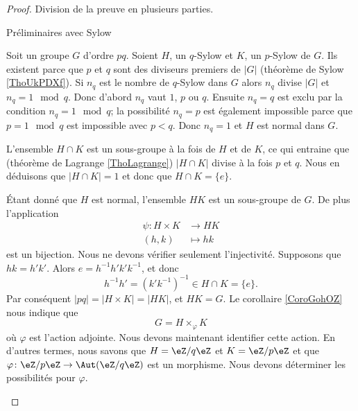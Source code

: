 \begin{proof}
    Division de la preuve en plusieurs parties.
    \begin{subproof}
    \item[Préliminaires avec Sylow]

        Soit un groupe \( G\) d'ordre \( pq\). Soient \( H\), un \( q\)-Sylow et \( K\), un \( p\)-Sylow de \( G\). Ils existent parce que \( p\) et \( q\) sont des diviseurs premiers de \( | G |\) (théorème de Sylow \ref{ThoUkPDXf}). Si \( n_q\) est le nombre de \( q\)-Sylow dans \( G\) alors \( n_q\) divise \( | G |\) et \( n_q=1\mod q\). Donc d'abord \( n_q\) vaut \( 1\), \( p\) ou \( q\). Ensuite \( n_q=q\) est exclu par la condition \( n_q=1\mod q\); la possibilité \( n_q=p\) est également impossible parce que \( p=1\mod q\) est impossible avec \( p<q\). Donc \( n_q=1\) et \( H\) est normal dans \( G\).

        L'ensemble \( H\cap K\) est un sous-groupe à la fois de \( H\) et de \( K\), ce qui entraine que (théorème de Lagrange \ref{ThoLagrange}) \( | H\cap K |\) divise à la fois \( p\) et \( q\). Nous en déduisons que \( | H\cap K |=1\) et donc que \( H\cap K=\{ e \}\).

        Étant donné que \( H\) est normal, l'ensemble \( HK\) est un sous-groupe de \( G\). De plus l'application
        \begin{equation}
            \begin{aligned}
                \psi\colon H\times K&\to HK \\
                (h,k)&\mapsto hk 
            \end{aligned}
        \end{equation}
        est un bijection. Nous ne devons vérifier seulement l'injectivité. Supposons que \( hk=h'k'\). Alors \( e=h^{-1}h'k'k^{-1}\), et donc
        \begin{equation}
            h^{-1} h'=(k'k^{-1})^{-1}\in H\cap K=\{ e \}.
        \end{equation}
        Par conséquent \( | pq |=| H\times K |=| HK |\), et \( HK=G\). Le corollaire \ref{CoroGohOZ} nous indique que
        \begin{equation}    \label{EqGjQjFN}
            G=H\times_{\varphi}K
        \end{equation}
        où \( \varphi\) est l'action adjointe. Nous devons maintenant identifier cette action. En d'autres termes, nous savons que \( H=\eZ/q\eZ\) et \( K=\eZ/p\eZ\) et que \( \varphi\colon \eZ/p\eZ\to \Aut(\eZ/q\eZ)\) est un morphisme. Nous devons déterminer les possibilités pour \( \varphi\).


\end{subproof}
\end{proof}
